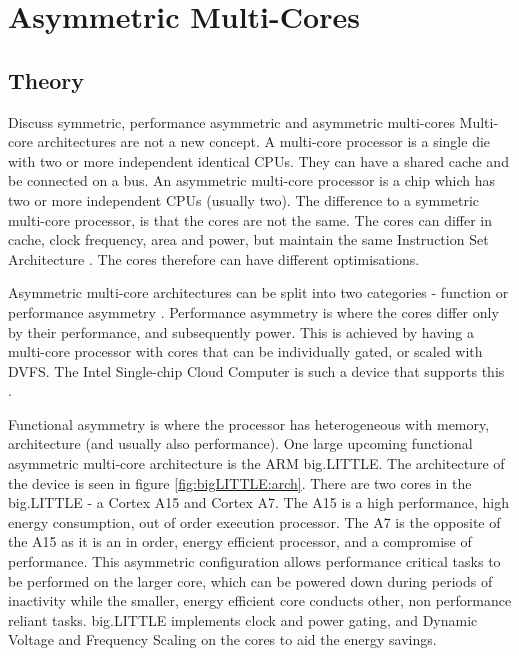 
\section{Asymmetric Multi-Cores}

\subsection{Theory}
Discuss symmetric, performance asymmetric and asymmetric multi-cores
Multi-core architectures are not a new concept. 
A multi-core processor is a single die with two or more independent identical CPUs. 
They can have a shared cache and be connected on a bus.
An asymmetric multi-core processor is a chip which has two or more independent CPUs (usually two).
The difference to a symmetric multi-core processor, is that the cores are not the same. 
The cores can differ in cache, clock frequency, area and power, but maintain the same Instruction Set Architecture \cite{SilvaPower}.
The cores therefore can have different optimisations.


Asymmetric multi-core architectures can be split into two categories - function or performance asymmetry \cite{WangEnergy}.
Performance asymmetry is where the cores differ only by their performance, and subsequently power. 
This is achieved by having a multi-core processor with cores that can be individually gated, or scaled with DVFS.
The Intel Single-chip Cloud Computer is such a device that supports this \cite{IntelSCC}.

Functional asymmetry is where the processor has heterogeneous with memory, architecture (and usually also performance).
One large upcoming functional asymmetric multi-core architecture is the ARM big.LITTLE. 
The architecture of the device is seen in figure \ref{fig:bigLITTLE:arch}.
There are two cores in the big.LITTLE - a Cortex A15 and Cortex A7.
The A15 is a high performance, high energy consumption, out of order execution processor.
The A7 is the opposite of the A15 as it is an in order, energy efficient processor, and a compromise of performance.
This asymmetric configuration allows performance critical tasks to be performed on the larger core, which can be powered down during periods of inactivity while the smaller, energy efficient core conducts other, non performance reliant tasks.
big.LITTLE implements clock and power gating, and Dynamic Voltage and Frequency Scaling on the cores to aid the energy savings.


